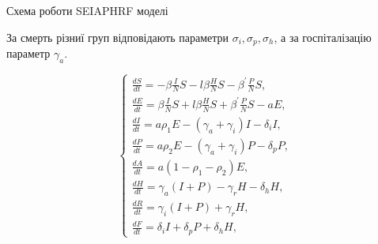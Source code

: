 \begin{risunok}[ht]
    \vspace{0.5cm}
    \caption{Схема роботи SEIAPHRF моделі}
    \label{SEIAPHRF graph}
\end{risunok}




За смерть різниї груп відповідають параметри 
$\sigma_i, \sigma_p, \sigma_h$, а за госпіталізацію параметр
$\gamma_a$. 

\begin{equation*}
    \left\{\begin{array}{l}
    \frac{d S}{d t}=-\beta \frac{I}{N} S-l \beta \frac{H}{N} S-\beta^{\prime} \frac{P}{N} S, \\
    \frac{d E}{d t}=\beta \frac{I}{N} S+l \beta \frac{H}{N} S+\beta^{\prime} \frac{P}{N} S- a E, \\
    \frac{d I}{d t}= a \rho_1 E-\left(\gamma_a+\gamma_i\right) I-\delta_i I, \\
    \frac{d P}{d t}= a\rho_2 E-\left(\gamma_a+\gamma_i\right) P-\delta_p P, \\
    \frac{d A}{d t}= a\left(1-\rho_1-\rho_2\right) E, \\
    \frac{d H}{d t}=\gamma_a(I+P)-\gamma_r H-\delta_h H, \\
    \frac{d R}{d t}=\gamma_i(I+P)+\gamma_r H, \\
    \frac{d F}{d t}=\delta_i I+\delta_p P+\delta_h H,
    \end{array}\right.
\end{equation*}
